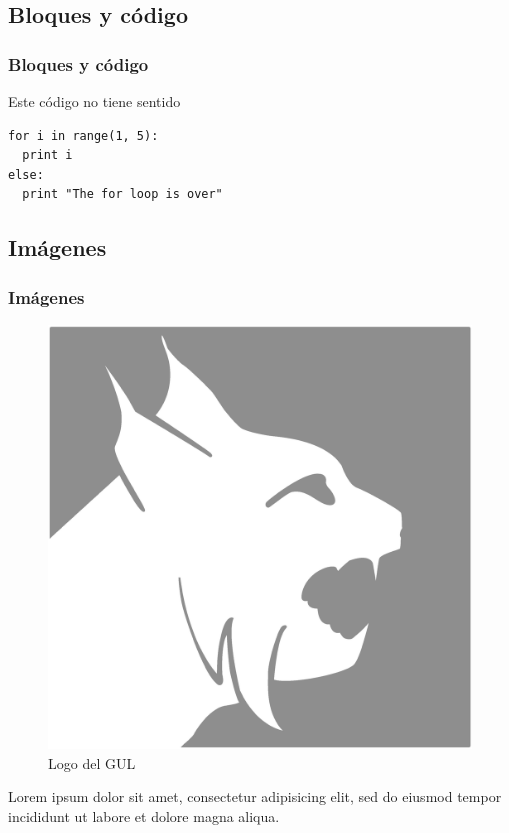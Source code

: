 \documentclass[aspectratio=43]{beamer}
\begin{document}
\subsection{Bloques y código}

\begin{frame}[fragile] %
    \frametitle{Bloques y código}
    \begin{block}{Este código no tiene sentido} %
        \begin{verbatim} 
for i in range(1, 5):
  print i
else:
  print "The for loop is over"
        \end{verbatim}
    \end{block}
\end{frame}

\subsection{Imágenes}

\begin{frame}
    \frametitle{Imágenes}
    \begin{figure}
        \includegraphics[scale=0.5]{img/logo1.png}
        \caption{Logo del GUL}
    \end{figure}
    Lorem ipsum dolor sit amet, consectetur adipisicing elit, sed do eiusmod tempor incididunt ut labore et dolore magna aliqua.
\end{frame}
\end{document}
